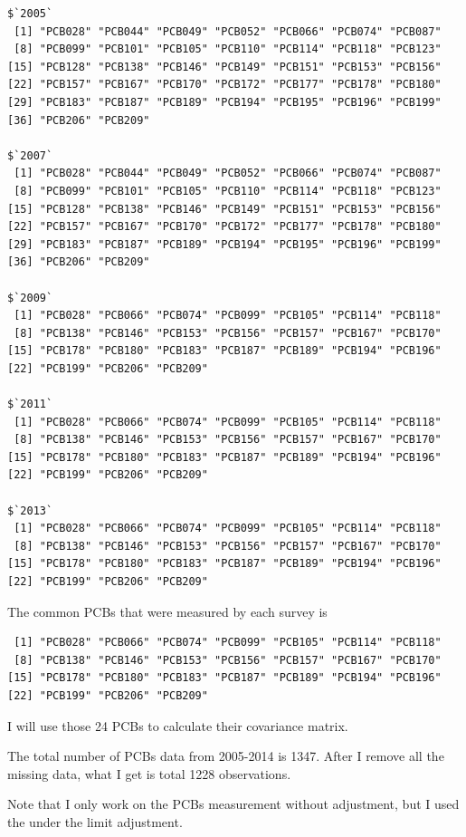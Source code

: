 \documentclass[]{article}
\begin{document}
\begin{verbatim}
$`2005`
 [1] "PCB028" "PCB044" "PCB049" "PCB052" "PCB066" "PCB074" "PCB087"
 [8] "PCB099" "PCB101" "PCB105" "PCB110" "PCB114" "PCB118" "PCB123"
[15] "PCB128" "PCB138" "PCB146" "PCB149" "PCB151" "PCB153" "PCB156"
[22] "PCB157" "PCB167" "PCB170" "PCB172" "PCB177" "PCB178" "PCB180"
[29] "PCB183" "PCB187" "PCB189" "PCB194" "PCB195" "PCB196" "PCB199"
[36] "PCB206" "PCB209"

$`2007`
 [1] "PCB028" "PCB044" "PCB049" "PCB052" "PCB066" "PCB074" "PCB087"
 [8] "PCB099" "PCB101" "PCB105" "PCB110" "PCB114" "PCB118" "PCB123"
[15] "PCB128" "PCB138" "PCB146" "PCB149" "PCB151" "PCB153" "PCB156"
[22] "PCB157" "PCB167" "PCB170" "PCB172" "PCB177" "PCB178" "PCB180"
[29] "PCB183" "PCB187" "PCB189" "PCB194" "PCB195" "PCB196" "PCB199"
[36] "PCB206" "PCB209"

$`2009`
 [1] "PCB028" "PCB066" "PCB074" "PCB099" "PCB105" "PCB114" "PCB118"
 [8] "PCB138" "PCB146" "PCB153" "PCB156" "PCB157" "PCB167" "PCB170"
[15] "PCB178" "PCB180" "PCB183" "PCB187" "PCB189" "PCB194" "PCB196"
[22] "PCB199" "PCB206" "PCB209"

$`2011`
 [1] "PCB028" "PCB066" "PCB074" "PCB099" "PCB105" "PCB114" "PCB118"
 [8] "PCB138" "PCB146" "PCB153" "PCB156" "PCB157" "PCB167" "PCB170"
[15] "PCB178" "PCB180" "PCB183" "PCB187" "PCB189" "PCB194" "PCB196"
[22] "PCB199" "PCB206" "PCB209"

$`2013`
 [1] "PCB028" "PCB066" "PCB074" "PCB099" "PCB105" "PCB114" "PCB118"
 [8] "PCB138" "PCB146" "PCB153" "PCB156" "PCB157" "PCB167" "PCB170"
[15] "PCB178" "PCB180" "PCB183" "PCB187" "PCB189" "PCB194" "PCB196"
[22] "PCB199" "PCB206" "PCB209"
\end{verbatim}

The common PCBs that were measured by each survey is

\begin{verbatim}
 [1] "PCB028" "PCB066" "PCB074" "PCB099" "PCB105" "PCB114" "PCB118"
 [8] "PCB138" "PCB146" "PCB153" "PCB156" "PCB157" "PCB167" "PCB170"
[15] "PCB178" "PCB180" "PCB183" "PCB187" "PCB189" "PCB194" "PCB196"
[22] "PCB199" "PCB206" "PCB209"
\end{verbatim}

I will use those 24 PCBs to calculate their covariance matrix.

The total number of PCBs data from 2005-2014 is 1347. After I remove all
the missing data, what I get is total 1228 observations.

Note that I only work on the PCBs measurement without adjustment, but I
used the under the limit adjustment.
\end{document}
